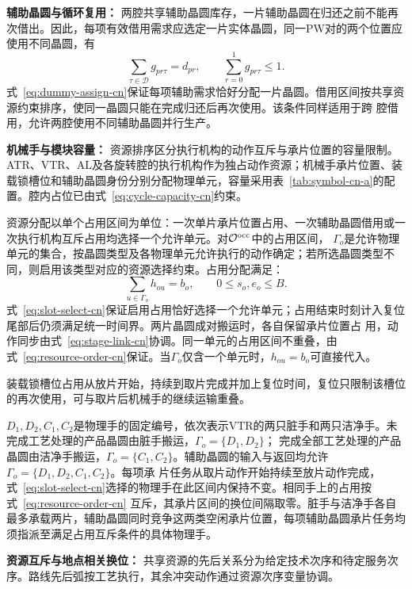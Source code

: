 \noindent\textbf{辅助晶圆与循环复用：}
两腔共享辅助晶圆库存，一片辅助晶圆在归还之前不能再次借出。因此，每项有效借用需求应选定一片实体晶圆，同一PW对的两个位置应使用不同晶圆，有
\begin{equation}
\sum_{\tau\in\mathcal D}g_{pr\tau}=d_{pr},\qquad
\sum_{r=0}^{1}g_{pr\tau}\le1.
\label{eq:dummy-assign-cn}
\end{equation}
式~\eqref{eq:dummy-assign-cn}保证每项辅助需求恰好分配一片晶圆。借用区间按共享资源约束排序，使同一晶圆只能在完成归还后再次使用。该条件同样适用于跨
腔借用，允许两腔使用不同辅助晶圆并行生产。

\noindent\textbf{机械手与模块容量：}
资源排序区分执行机构的动作互斥与承片位置的容量限制。ATR、VTR、AL及各旋转腔的执行机构作为独占动作资源；机械手承片位置、装载锁槽位和辅助晶圆身份分别分配物理单元，容量采用表~\ref{tab:symbol-cn-a}的配置。腔内占位已由式~\eqref{eq:cycle-capacity-cn}约束。

资源分配以单个占用区间为单位：一次单片承片位置占用、一次辅助晶圆借用或一次执行机构互斥占用均选择一个允许单元。对$\mathcal O^{\rm occ}$中的占用区间，
$\Gamma_o$是允许物理单元的集合，按晶圆类型及各物理单元允许执行的动作确定；若所选晶圆类型不同，则启用该类型对应的资源选择约束。占用分配满足：
\begin{equation}
\sum_{u\in\Gamma_o}h_{ou}=b_o,\qquad 0\le s_o,e_o\le B.
\label{eq:slot-select-cn}
\end{equation}
式~\eqref{eq:slot-select-cn}保证启用占用恰好选择一个允许单元；占用结束时刻计入复位尾部后仍须满足统一时间界。两片晶圆成对搬运时，各自保留承片位置占
用，动作同步由式~\eqref{eq:stage-link-cn}协调。同一单元的占用区间不重叠，由式~\eqref{eq:resource-order-cn}保证。当$\Gamma_o$仅含一个单元时，$h_{ou}=b_o$可直接代入。

装载锁槽位占用从放片开始，持续到取片完成并加上复位时间，复位只限制该槽位的再次使用，可与取片后机械手的继续运输重叠。

$D_1,D_2,C_1,C_2$是物理手的固定编号，依次表示VTR的两只脏手和两只洁净手。未完成工艺处理的产品晶圆由脏手搬运，$\Gamma_o=\{D_1,D_2\}$；
完成全部工艺处理的产品晶圆由洁净手搬运，$\Gamma_o=\{C_1,C_2\}$。辅助晶圆的输入与返回均允许$\Gamma_o=\{D_1,D_2,C_1,C_2\}$。每项承
片任务从取片动作开始持续至放片动作完成，式~\eqref{eq:slot-select-cn}选择的物理手在此区间内保持不变。相同手上的占用按式~\eqref{eq:resource-order-cn}
互斥，其承片区间的换位间隔取零。脏手与洁净手各自最多承载两片，辅助晶圆同时竞争这两类空闲承片位置，每项辅助晶圆承片任务均须指派至满足占用互斥条件的具体物理手。

\noindent\textbf{资源互斥与地点相关换位：}
共享资源的先后关系分为给定技术次序和待定服务次序。路线先后弧按工艺执行，其余冲突动作通过资源次序变量协调。

